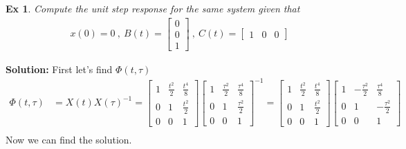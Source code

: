 \documentclass[twoside]{article}
\newtheorem{exmp}[theorem]{Ex}
\begin{document}
\begin{exmp}
Compute the unit step response for the same system given that
\begin{align*}
	x(0) = 0 \ , \ B(t) = \begin{bmatrix} 0 \\ 0 \\ 1 \end{bmatrix} 
	\ , \
	C(t) = \begin{bmatrix} 1 & 0 & 0 \end{bmatrix} 
\end{align*}
\end{exmp}
%
\textbf{Solution:} First let's find $\Phi(t , \tau)$
%
\begin{align*}
	\Phi(t , \tau) &= X(t) X(\tau)^{-1} = \begin{bmatrix} 1 & \frac{t^2}{2} & \frac{t^4}{8} \\ 0 & 1 & \frac{t^2}{2} \\ 0 & 0 & 1 \end{bmatrix} 
	\begin{bmatrix} 1 & \frac{\tau^2}{2} & \frac{\tau^4}{8} \\ 0 & 1 & \frac{\tau^2}{2} \\ 0 & 0 & 1 \end{bmatrix}^{-1}
	= \begin{bmatrix} 1 & \frac{t^2}{2} & \frac{t^4}{8} \\ 0 & 1 & \frac{t^2}{2} \\ 0 & 0 & 1 \end{bmatrix} 
	\begin{bmatrix} 1 & -\frac{\tau^2}{2} & \frac{\tau^4}{8}  \\ 0 & 1 & -\frac{\tau^2}{2} \\ 0 & 0 & 1 \end{bmatrix}
	\\
\end{align*}
%
Now we can find the solution.
%
\end{document}
